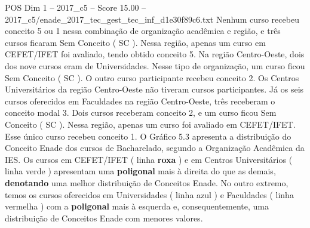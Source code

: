 \begin{textsample}{POS Dim 1 – 2017\_c5 – Score 15.00 – 2017\_c5/enade\_2017\_tec\_gest\_tec\_inf\_d1e30f89c6.txt}
Nenhum curso recebeu conceito 5 ou 1 nessa combinação de organização acadêmica e região, e três cursos ficaram Sem Conceito ( SC ).
Nessa região, apenas um curso em CEFET/IFET foi avaliado, tendo obtido conceito 5.
Na região Centro-Oeste, dois dos nove cursos eram de Universidades.
Nesse tipo de organização, um curso ficou Sem Conceito ( SC ).
O outro curso participante recebeu conceito 2.
Os Centros Universitários da região Centro-Oeste não tiveram cursos participantes.
Já os seis cursos oferecidos em Faculdades na região Centro-Oeste, três receberam o conceito modal 3.
Dois cursos receberam conceito 2, e um curso ficou Sem Conceito ( SC ).
Nessa região, apenas um curso foi avaliado em CEFET/IFET.
Esse único curso recebeu conceito 1.
O Gráfico 5.3 apresenta a distribuição do Conceito Enade dos cursos de Bacharelado, segundo a Organização Acadêmica da IES.
Os cursos em CEFET/IFET ( linha \textbf{roxa} ) e em Centros Universitários ( linha verde ) apresentam uma \textbf{poligonal} mais à direita do que as demais, \textbf{denotando} uma melhor distribuição de Conceitos Enade.
No outro extremo, temos os cursos oferecidos em Universidades ( linha azul ) e Faculdades ( linha vermelha ) com a \textbf{poligonal} mais à esquerda e, consequentemente, uma distribuição de Conceitos Enade com menores valores.

\end{textsample}
